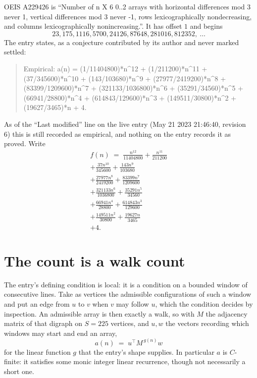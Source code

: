 \documentclass[11pt,a4paper]{article}
\theoremstyle{plain}
\theoremstyle{definition}
\begin{document}
OEIS A229426 is ``Number of n X 6 0..2 arrays with horizontal differences mod 3 never 1, vertical differences mod 3 never -1, rows lexicographically nondecreasing, and columns lexicographically nonincreasing.''. It has offset $1$ and begins
\[
23, 175, 1116, 5700, 24126, 87648, 281016, 812352,\ \dots
\]
The entry states, as a conjecture contributed by its author and never marked settled:
\begin{quote}
Empirical: a(n) = (1/11404800)*n\^{}12 + (1/211200)*n\^{}11 + (37/345600)*n\^{}10 + (143/103680)*n\^{}9 + (27977/2419200)*n\^{}8 + (83399/1209600)*n\^{}7 + (321133/1036800)*n\^{}6 + (35291/34560)*n\^{}5 + (66941/28800)*n\^{}4 + (614843/129600)*n\^{}3 + (149511/30800)*n\^{}2 + (19627/3465)*n + 4.
\end{quote}
As of the ``Last modified'' line on the live entry (May 21 2023 21:46:40, revision 6) this is still
recorded as empirical, and nothing on the entry records it as proved. Write
\begin{multline*}
f(n)\;=\;\frac{n^{12}}{11404800} + \frac{n^{11}}{211200} \\
+ \frac{37 n^{10}}{345600} + \frac{143 n^{9}}{103680} \\
+ \frac{27977 n^{8}}{2419200} + \frac{83399 n^{7}}{1209600} \\
+ \frac{321133 n^{6}}{1036800} + \frac{35291 n^{5}}{34560} \\
+ \frac{66941 n^{4}}{28800} + \frac{614843 n^{3}}{129600} \\
+ \frac{149511 n^{2}}{30800} + \frac{19627 n}{3465} \\
+ 4.
\end{multline*}

\section{The count is a walk count}

The entry's defining condition is local: it is a condition on a bounded window of consecutive lines. Take as vertices the
admissible configurations of such a window and put an edge from $u$ to $v$ when $v$ may
follow $u$, which the condition decides by inspection. An admissible array is then exactly a
walk, so with $M$ the adjacency matrix of that digraph on $S=225$ vertices, and $u,w$ the
vectors recording which windows may start and end an array,
\[
a(n)\;=\;u^{\!\top}M^{\,g(n)}w
\]
for the linear function $g$ that the entry's shape supplies. In particular $a$ is
$C$-finite: it satisfies some monic integer linear recurrence, though not necessarily a short
one.
\end{document}
